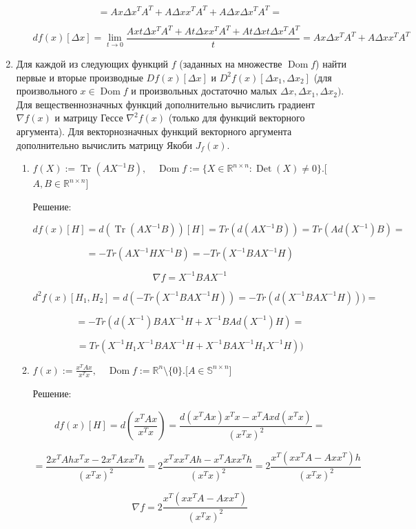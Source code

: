 \documentclass{article}
\newcommand{\R}{\mathbb{R}}
\renewcommand{\S}{\mathbb{S}}
\DeclareMathOperator*{\Tr}{Tr}
\DeclareMathOperator*{\Det}{Det}
\DeclareMathOperator*{\Dom}{Dom}
\begin{document}
\begin{enumerate}[label=\textbf{\arabic*}, leftmargin=0em]
\begin{enumerate}
$$
= Ax \Delta x^T A^T  + A\Delta x x^T A^T + A\Delta x \Delta x^T A^T =
$$

$$
d f(x)[\Delta x] = \lim_{t\to 0} \frac{Ax t\Delta x^T A^T  + A t\Delta x x^T A^T + At \Delta x t\Delta x^T A^T}{t} = Ax \Delta x^T A^T  + A \Delta x x^T A^T
$$

\end{enumerate}

\item Для каждой из следующих функций $f$ (заданных на множестве $\Dom f$) найти первые и вторые производные $Df(x)[\Delta x]$ и $D^2f(x)[\Delta x_1, \Delta x_2]$ (для произвольного $x \in \Dom f$ и произвольных достаточно малых $\Delta x, \Delta x_1, \Delta x_2)$. Для вещественнозначных функций дополнительно вычислить градиент $\nabla f(x)$ и матрицу Гессе $\nabla^2 f(x)$ (только для функций векторного аргумента). Для векторнозначных функций векторного аргумента дополнительно вычислить матрицу Якоби $J_f(x)$.
\begin{enumerate}
\item $\displaystyle f(X) := \Tr(A X^{-1} B), \quad \Dom f := \{ X \in \R^{n \times n} : \Det(X) \neq 0 \}$.\hfill[$A, B \in \R^{n \times n}$]

Решение:

$$
df(x)[H] = d(\Tr(A X^{-1} B))[H] = Tr(d(AX^{-1}B)) = Tr(Ad(X^{-1})B) =
$$

$$
= -Tr(AX^{-1}HX^{-1}B) = -Tr(X^{-1}BAX^{-1}H)
$$

$$
\nabla f = X^{-1}BAX^{-1}
$$

$$
d^2 f(x)[H_1, H_2] = d(-Tr(X^{-1}BAX^{-1}H)) = -Tr(d(X^{-1}BA  X^{-1}H))) =
$$

$$
= -Tr(d(X^{-1})BAX^{-1}H + X^{-1}BAd(X^{-1})H) =
$$

$$
= Tr(X^{-1}H_1X^{-1}BAX^{-1}H + X^{-1}BAX^{-1}H_1X^{-1}H))
$$

\item $\displaystyle f(x) := \frac{x^T A x}{x^T x}, \quad \Dom f := \R^n \setminus \{0\}$.\hfill[$A \in \S^{n \times n}$]

Решение:

$$
df(x)[H] = d(\frac{x^T A x}{x^T x}) = \frac{d(x^T A x) x^T x - x^T A x d(x^T x)}{(x^T x)^2} =
$$

$$
= \frac{2x^TAh x^T x - 2x^T A x x^T h}{(x^T x)^2} = 2\frac{x^Tx x^TAh - x^T A x x^T h}{(x^T x)^2} = 2\frac{x^T(x x^TA - A x x^T)h}{(x^T x)^2}
$$

$$
\nabla f = 2\frac{x^T(x x^TA - A x x^T)}{(x^T x)^2}
$$




\end{enumerate}
\end{enumerate}
\end{document}

